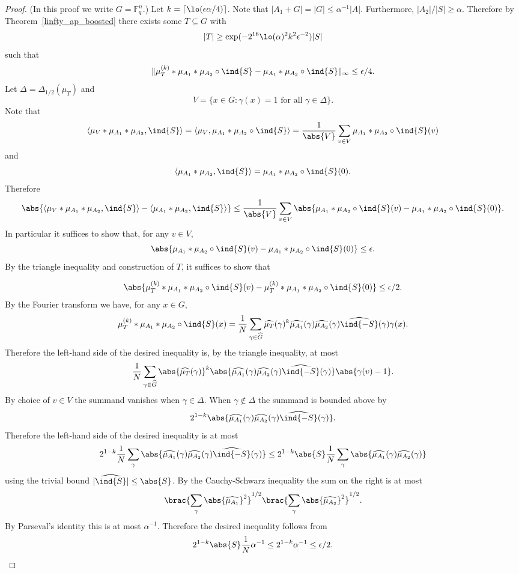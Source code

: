\begin{proof}
\leanok
(In this proof we write $G=\mathbb{F}_q^n$.) Let $k=\lceil \lo(\epsilon\alpha/4)\rceil$. Note that $\lvert A_1+G\rvert=\lvert G\rvert\leq \alpha^{-1}\lvert A\rvert$. Furthermore, $\lvert A_2\rvert/\lvert S\rvert\geq \alpha$. Therefore by Theorem~\ref{linfty_ap_boosted} there exists some $T\subseteq G$ with
\[\lvert T\rvert \geq \exp(-2^{16}\lo(\alpha)^2k^2\epsilon^{-2})\lvert S\rvert\]
such that
\[\| \mu_T^{(k)}\ast \mu_{A_1}\ast \mu_{A_2}\circ \ind{S}-\mu_{A_1}\ast \mu_{A_2}\circ \ind{S}\|_{\infty}\leq \epsilon/4.\]
Let $\Delta=\Delta_{1/2}(\mu_T)$ and
\[V = \{ x \in G : \gamma(x)=1\textrm{ for all }\gamma\in\Delta\}.\]
Note that
\[\langle \mu_V\ast \mu_{A_1}\ast \mu_{A_2},\ind{S}\rangle = \langle \mu_V,\mu_{A_1}\ast \mu_{A_2}\circ \ind{S}\rangle=\frac{1}{\abs{V}}\sum_{v\in V}\mu_{A_1}\ast \mu_{A_2}\circ \ind{S}(v)\]
and
\[\langle \mu_{A_1}\ast \mu_{A_2},\ind{S}\rangle = \mu_{A_1}\ast \mu_{A_2}\circ\ind{S}(0).\]
Therefore
\[\abs{\langle \mu_V\ast \mu_{A_1}\ast \mu_{A_2},\ind{S}\rangle-\langle \mu_{A_1}\ast \mu_{A_2},\ind{S}\rangle}\leq \frac{1}{\abs{V}}\sum_{v\in V}\abs{\mu_{A_1}\ast \mu_{A_2}\circ \ind{S}(v)-\mu_{A_1}\ast \mu_{A_2}\circ \ind{S}(0)}.\]
In particular it suffices to show that, for any $v\in V$,
\[\abs{\mu_{A_1}\ast \mu_{A_2}\circ \ind{S}(v)-\mu_{A_1}\ast \mu_{A_2}\circ \ind{S}(0)}\leq \epsilon.\]
By the triangle inequality and construction of $T$, it suffices to show that

\[\abs{\mu_T^{(k)}\ast \mu_{A_1}\ast \mu_{A_2}\circ \ind{S}(v)-\mu_T^{(k)}\ast\mu_{A_1}\ast \mu_{A_2}\circ \ind{S}(0)}\leq \epsilon/2.\]
By the Fourier transform we have, for any $x\in G$,
\[\mu_T^{(k)}\ast \mu_{A_1}\ast \mu_{A_2}\circ \ind{S}(x)=\frac{1}{N}\sum_{\gamma\in \widehat{G}}\widehat{\mu_T}(\gamma)^k\widehat{\mu_{A_1}}(\gamma)\widehat{\mu_{A_2}}(\gamma)\widehat{\ind{-S}}(\gamma)\gamma(x).\]
Therefore the left-hand side of the desired inequality is, by the triangle inequality, at most
\[\frac{1}{N}\sum_{\gamma\in \widehat{G}}\abs{\widehat{\mu_T}(\gamma)}^k\abs{\widehat{\mu_{A_1}}(\gamma)\widehat{\mu_{A_2}}(\gamma)\widehat{\ind{-S}}(\gamma)}\abs{\gamma(v)-1}.\]
By choice of $v\in V$ the summand vanishes when $\gamma\in\Delta$. When $\gamma\not\in \Delta$ the summand is bounded above by
\[2^{1-k}\abs{\widehat{\mu_{A_1}}(\gamma)\widehat{\mu_{A_2}}(\gamma)\widehat{\ind{-S}}(\gamma)}.\]
Therefore the left-hand side of the desired inequality is at most
\[2^{1-k}\frac{1}{N}\sum_{\gamma}\abs{\widehat{\mu_{A_1}}(\gamma)\widehat{\mu_{A_2}}(\gamma)\widehat{\ind{-S}}(\gamma)}\leq 2^{1-k}\abs{S}\frac{1}{N}\sum_{\gamma}\abs{\widehat{\mu_{A_1}}(\gamma)\widehat{\mu_{A_2}}(\gamma)}\]
using the trivial bound $\lvert\widehat{\ind{S}}\rvert\leq \abs{S}$. By the Cauchy-Schwarz inequality the sum on the right is at most
\[\brac{\sum_\gamma \abs{\widehat{\mu_{A_1}}}^2}^{1/2}\brac{\sum_\gamma \abs{\widehat{\mu_{A_2}}}^2}^{1/2}.\]
By Parseval's identity this is at most $\alpha^{-1}$. Therefore the desired inequality follows from
\[2^{1-k}\abs{S}\frac{1}{N}\alpha^{-1}\leq 2^{1-k}\alpha^{-1}\leq \epsilon/2.\]


\end{proof}
